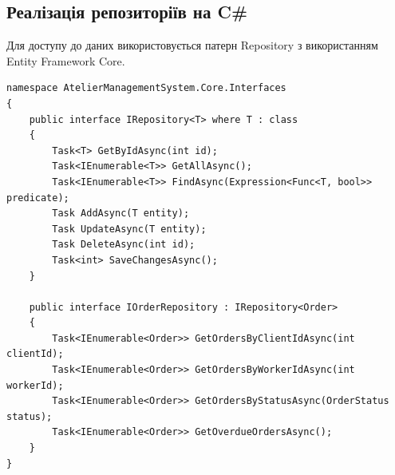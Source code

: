 \documentclass[14pt,a4paper]{extarticle}
\begin{document}
\newpage
\subsection{Реалізація репозиторіїв на C\#}

Для доступу до даних використовується патерн Repository з використанням Entity Framework Core.

\begin{lstlisting}[language={[Sharp]C}, caption=Інтерфейс репозиторію, basicstyle=\small\ttfamily, breaklines=true, frame=single]
namespace AtelierManagementSystem.Core.Interfaces
{
    public interface IRepository<T> where T : class
    {
        Task<T> GetByIdAsync(int id);
        Task<IEnumerable<T>> GetAllAsync();
        Task<IEnumerable<T>> FindAsync(Expression<Func<T, bool>> predicate);
        Task AddAsync(T entity);
        Task UpdateAsync(T entity);
        Task DeleteAsync(int id);
        Task<int> SaveChangesAsync();
    }
    
    public interface IOrderRepository : IRepository<Order>
    {
        Task<IEnumerable<Order>> GetOrdersByClientIdAsync(int clientId);
        Task<IEnumerable<Order>> GetOrdersByWorkerIdAsync(int workerId);
        Task<IEnumerable<Order>> GetOrdersByStatusAsync(OrderStatus status);
        Task<IEnumerable<Order>> GetOverdueOrdersAsync();
    }
}
\end{lstlisting}
\end{document}
